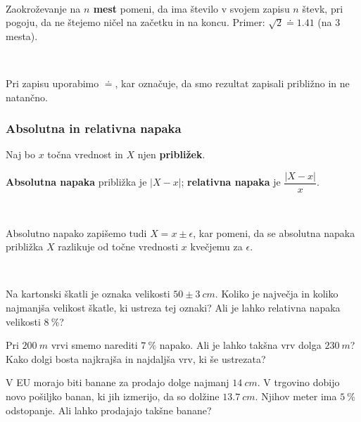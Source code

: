             ~~
        
            Zaokroževanje na \textbf{$n$ mest} pomeni, 
            da ima število v svojem zapisu $n$ števk, 
            pri pogoju, da ne štejemo ničel na začetku in na koncu.
            Primer: $\sqrt{2}\doteq 1.41$ (na $3$ mesta).
        
            ~
        
            Pri zapisu uporabimo $\doteq$, kar označuje, da smo rezultat zapisali približno in ne natančno.
        

    

    
        \subsubsection*{Absolutna in relativna napaka}
            Naj bo $x$ točna vrednost in $X$ njen \textbf{približek}.

            \textbf{Absolutna napaka} približka je $\left\lvert X-x\right\rvert$; 
            \textbf{relativna napaka} je $\dfrac{\left\lvert X-x\right\rvert}{x}$.
        
            ~~
        
            Absolutno napako zapišemo tudi $X=x\pm\epsilon$, kar pomeni, da se absolutna napaka približka $X$ razlikuje od točne vrednosti $x$ kvečjemu za $\epsilon$.
        
    
~~\\


    
        \begin{naloga}
            Na kartonski škatli je oznaka velikosti $50 \pm 3 ~cm$.
            Koliko je največja in koliko najmanjša velikost škatle, ki ustreza tej oznaki? 
            Ali je lahko relativna napaka velikosti $8~\%$?            
        \end{naloga}
        
        \begin{naloga}
            Pri $200~m$ vrvi smemo narediti $7~\%$ napako.
            Ali je lahko takšna vrv dolga $230~m$?
            Kako dolgi bosta najkrajša in najdaljša vrv, ki še ustrezata?            
        \end{naloga}
        
        \begin{naloga}
            V EU morajo biti banane za prodajo dolge najmanj $14~cm$. 
            V trgovino dobijo novo pošiljko banan, ki jih izmerijo, da so dolžine $13.7~cm$. 
            Njihov meter ima $5~\%$ odstopanje. 
            Ali lahko prodajajo takšne banane?            
        \end{naloga}

    